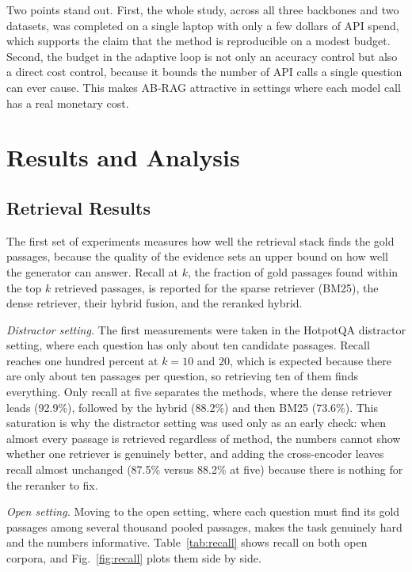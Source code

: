 \documentclass[conference,a4paper,10pt]{IEEEtran}
\begin{document}
Two points stand out. First, the whole study, across all three backbones and two datasets,
was completed on a single laptop with only a few dollars of API spend, which supports the
claim that the method is reproducible on a modest budget. Second, the budget in the
adaptive loop is not only an accuracy control but also a direct cost control, because it
bounds the number of API calls a single question can ever cause. This makes AB-RAG
attractive in settings where each model call has a real monetary cost.

\section{Results and Analysis}
\label{sec:results}

\subsection{Retrieval Results}
The first set of experiments measures how well the retrieval stack finds the gold
passages, because the quality of the evidence sets an upper bound on how well the
generator can answer. Recall at $k$, the fraction of gold passages found within the top
$k$ retrieved passages, is reported for the sparse retriever (BM25), the dense retriever,
their hybrid fusion, and the reranked hybrid.

\textit{Distractor setting.}
The first measurements were taken in the HotpotQA distractor setting, where each question
has only about ten candidate passages. Recall reaches one hundred percent at $k=10$ and
$20$, which is expected because there are only about ten passages per question, so
retrieving ten of them finds everything. Only recall at five separates the methods, where
the dense retriever leads (92.9\%), followed by the hybrid (88.2\%) and then BM25
(73.6\%). This saturation is why the distractor setting was used only as an early check:
when almost every passage is retrieved regardless of method, the numbers cannot show
whether one retriever is genuinely better, and adding the cross-encoder leaves recall
almost unchanged (87.5\% versus 88.2\% at five) because there is nothing for the reranker
to fix.

\textit{Open setting.}
Moving to the open setting, where each question must find its gold passages among several
thousand pooled passages, makes the task genuinely hard and the numbers informative.
Table~\ref{tab:recall} shows recall on both open corpora, and Fig.~\ref{fig:recall} plots
them side by side.
\end{document}
